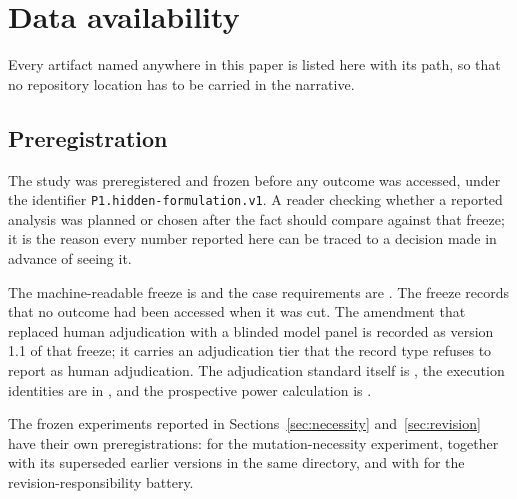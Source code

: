 \section{Data availability}
\label{sec:availability}

Every artifact named anywhere in this paper is listed here with its path, so
that no repository location has to be carried in the narrative.

\subsection{Preregistration}
The study was preregistered and frozen before any outcome was accessed, under the
identifier \texttt{P1.hidden-formulation.v1}.  A reader checking whether a
reported analysis was planned or chosen after the fact should compare against
that freeze; it is the reason every number reported here can be traced to a
decision made in advance of seeing it.

The machine-readable freeze is  and the case
requirements are . The freeze
records that no outcome had been accessed when it was cut. The amendment that
replaced human adjudication with a blinded model panel is recorded as version
1.1 of that freeze; it carries an adjudication tier that the record type refuses
to report as human adjudication. The adjudication standard itself is
, the execution identities are in
, and the prospective power calculation
is .

The frozen experiments reported in Sections~\ref{sec:necessity}
and~\ref{sec:revision} have their own preregistrations:
for the mutation-necessity experiment, together with its superseded earlier
versions in the same directory, and
 with
 for the
revision-responsibility battery.

